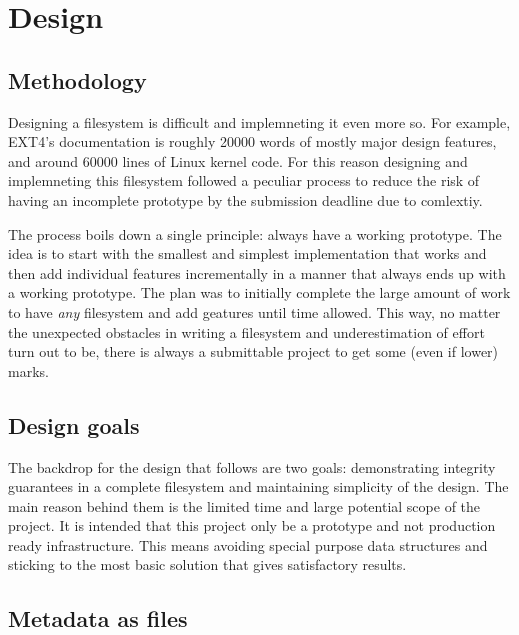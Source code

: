\chapter{Design}

    \section{Methodology}

        Designing a filesystem is difficult and implemneting it even more so.
        For example, EXT4's documentation
        \cite{https://www.kernel.org/doc/html/latest/filesystems/ext4/index.html}
        is roughly 20000 words of mostly major design features, and around
        60000 lines of Linux kernel code. For this reason designing and
        implemneting this filesystem followed a peculiar process to reduce the
        risk of having an incomplete prototype by the submission deadline due
        to comlextiy.

        The process boils down a single principle: always have a working
        prototype. The idea is to start with the smallest and simplest
        implementation that works and then add individual features
        incrementally in a manner that always ends up with a working prototype.
        The plan was to initially complete the large amount of work to have
        \textit{any} filesystem and add geatures until time allowed. This way,
        no matter the unexpected obstacles in writing a filesystem and
        underestimation of effort turn out to be, there is always a submittable
        project to get some (even if lower) marks.

    \section{Design goals}

        The backdrop for the design that follows are two goals: demonstrating
        integrity guarantees in a complete filesystem and maintaining
        simplicity of the design. The main reason behind them is the limited
        time and large potential scope of the project. It is intended that this
        project only be a prototype and not production ready infrastructure.
        This means avoiding special purpose data structures and sticking to the
        most basic solution that gives satisfactory results.

    \section{Metadata as files}

